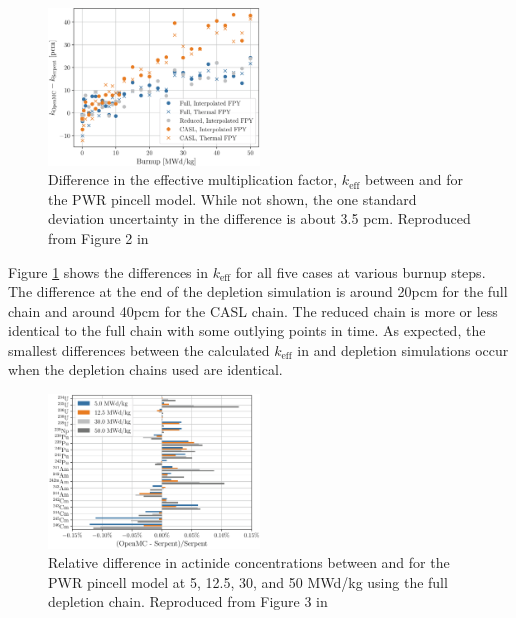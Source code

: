 \begin{figure}[htpb]
    \centering
    \includegraphics[width=0.5\textwidth]{figs/ch2/serpent_openmc_keff.png}
    \caption[Difference in the effective multiplication factor, $k_\text{eff}$
    between OpenMC and Serpent for the PWR pincell model.]{Difference in the
    effective multiplication factor, $k_\text{eff}$ between \OpenMC and \SerpentTWO
    for the PWR pincell model. While not shown, the one standard deviation
    uncertainty in the difference is about 3.5 pcm. Reproduced from Figure 2 in
    \cite{romano_depletion_2021}}
    \label{fig:pwr-serpent-openmc-keff}
\end{figure}

Figure \ref{fig:pwr-serpent-openmc-keff} shows the differences in $k_\text{eff}$
for all five cases at various burnup steps. The difference at the end of the depletion simulation is
around 20pcm for the full chain and around 40pcm for the CASL chain. The
reduced chain is more or less identical to the full chain with some outlying
points in time. As expected, the smallest differences between the calculated
$k_\text{eff}$ in \SerpentTWO and \OpenMC depletion simulations occur when the
depletion chains used are identical.

\begin{figure}[htpb]
    \centering
    \includegraphics[width=0.5\textwidth]{figs/ch2/serpent_openmc_actinides.png}
    \caption[Relative difference in actinide concentrations bewteen OpenMC and
    Serpent for the PWR pincell model.]{Relative difference in actinide
    concentrations between \OpenMC and \SerpentTWO for the PWR pincell model at 5,
    12.5, 30, and 50 MWd/kg using the full depletion chain. Reproduced from
    Figure 3 in \cite{romano_depletion_2021}}
    \label{fig:pwr-serpent-openmc-actinides}
\end{figure}

